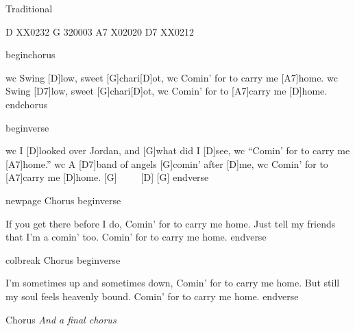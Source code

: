 
Traditional





D XX0232
G 320003
A7 X02020
D7 XX0212

beginchorus

wc Swing [D]low, sweet [G]chari[D]ot,
wc Comin{\textquoteright} for to carry me [A7]home.
wc Swing [D7]low, sweet [G]chari[D]ot,
wc Comin{\textquoteright} for to [A7]carry me [D]home.
endchorus

beginverse

wc I [D]looked over Jordan, and [G]what did I [D]see,
wc    {\textquotedblleft}Comin{\textquoteright} for to carry me [A7]home.{\textquotedblright}
wc A [D7]band of angels [G]comin{\textquoteright} after [D]me,
wc    Comin{\textquoteright} for to [A7]carry me [D]home.     [G]~~~~~[D]     [G]
endverse

newpage
Chorus
beginverse

If you get there before I do,
   Comin{\textquoteright} for to carry me home.
Just tell my friends that I{\textquoteright}m a comin{\textquoteright} too.
   Comin{\textquoteright} for to carry me home.
endverse

colbreak
Chorus
beginverse

I{\textquoteright}m sometimes up and sometimes down,
   Comin{\textquoteright} for to carry me home.
But still my soul feels heavenly bound.
   Comin{\textquoteright} for to carry me home.
endverse

Chorus
\textit{And a final chorus}

